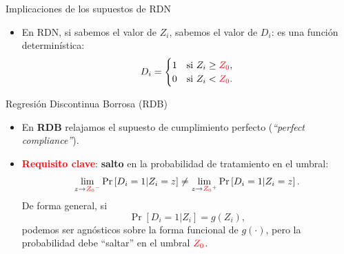 \documentclass[10pt, xcolor=dvipsnames]{beamer}
\begin{document}
\begin{frame}{Implicaciones de los supuestos de RDN}
\begin{itemize}
 		\item En RDN, si sabemos el valor de $Z_i$, sabemos el valor de $D_i$: es una función determinística:
	\begin{align*}
		D_i = 
		\begin{cases}
			1 & \text{si } Z_i \geq \textcolor{red}{Z_0},\\
			0 & \text{si } Z_i < \textcolor{red}{Z_0}. 	
		\end{cases}
	\end{align*}
    \begin{figure}
    \end{figure}
\end{itemize}
\end{frame}



\begin{frame}{Regresión Discontinua Borrosa (RDB)}
    \begin{itemize}\setlength{\itemsep}{1.0em}
        \item En \textbf{RDB} relajamos el supuesto de cumplimiento perfecto (\textit{``perfect compliance''}).  
        \pause
        \item \textcolor{red}{\textbf{Requisito clave}}: \textbf{salto} en la probabilidad de tratamiento en el umbral:
        \begin{align*}
            \lim_{z \to \textcolor{red}{Z_0}^-} \Pr\left[D_i=1|Z_i = z\right] \neq \lim_{z \to \textcolor{red}{Z_0}^+} \Pr\left[D_i=1| Z_i = z\right].
        \end{align*}
        \pause
        De forma general, si 
        \[
            \Pr[D_i=1|Z_i] = g(Z_i),
        \] 
        podemos ser agnósticos sobre la forma funcional de \(g(\cdot)\), pero la probabilidad debe ``saltar'' en el umbral $\textcolor{red}{Z_0}$. 
    \end{itemize}	
\end{frame}
\end{document}
